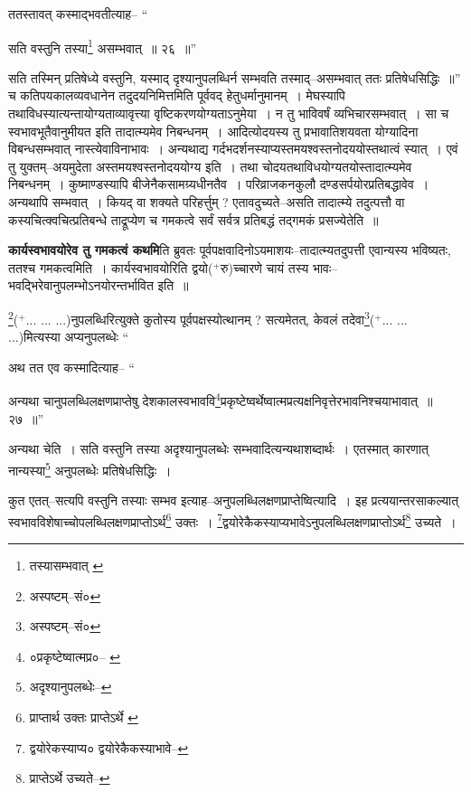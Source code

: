 \documentclass[article,12pt,a4paper]{memoir}
\newcommand{\add}[1]{($^{+}$#1)}
\begin{document}
	ततस्तावत् कस्माद्भवतीत्याह-- “
	  
	सति वस्तुनि तस्या\footnote{तस्यासम्भवात् \cite{dp-msC}} असम्भवात् ॥ २६ ॥” 
	  
	सति तस्मिन् प्रतिषेध्ये वस्तुनि, यस्माद् दृश्यानुपलब्धिर्न सम्भवति तस्माद्--असम्भवात् ततः प्रतिषेधसिद्धिः ॥” च कतिपयकालव्यवधानेन तदुदयनिमित्तमिति पूर्ववद् हेतुधर्मानुमानम् । मेघस्यापि तथाविधस्यात्यन्तायोग्यताव्यावृत्त्या वृष्टिकरणयोग्यताऽनुमेया । न तु भाविवर्षं व्यभिचारसम्भवात् । सा च स्वभावभूतैवानुमीयत इति तादात्म्यमेव निबन्धनम् । आदित्योदयस्य तु प्रभावातिशयवता योग्यादिना विबन्धसम्भवात् नास्त्येवाविनाभावः । अन्यथाद्य गर्दभदर्शनस्याप्यस्तमयश्वस्तनोदययोस्तथात्वं स्यात् । एवं तु युक्तम्--अयमुदेता अस्तमयश्वस्तनोदययोग्य इति । तथा चोदयतथाविधयोग्यतयोस्तादात्म्यमेव निबन्धनम् । कुष्माण्डस्यापि बीजेनैकसामग्र्यधीनतैव । परिव्राजकनकुलौ दण्डसर्पयोरप्रतिबद्धावेव । अन्यथापि सम्भवात् । कियद् वा शक्यते परिहर्त्तुम् ? एतावदुच्यते--असति तादात्म्ये तदुत्पत्तौ वा कस्यचित्क्वचित्प्रतिबन्धे ताद्रूप्येण च गमकत्वे सर्वं सर्वत्र प्रतिबद्धं तद्गमकं प्रसज्येतेति ॥
	\pend
      

	  \pstart \textbf{कार्यस्वभावयोरेव तु गमकत्वं कथमि}ति ब्रुवतः पूर्वपक्षवादिनोऽयमाशयः--तादात्म्यतदुपत्ती एवान्यस्य भविष्यतः, ततश्च गमकत्वमिति । कार्यस्वभावयोरिति द्वयो\add{रु}च्चारणे चायं तस्य भावः--भवद्भिरेवानुपलम्भोऽनयोरन्तर्भावित इति ॥
	\pend
      

	  \pstart \footnote{अस्पष्टम्--सं०}\add{... ... ...}नुपलब्धिरित्युक्ते कुतोस्य पूर्वपक्षस्योत्थानम् ? सत्यमेतत्, केवलं तदेवा\footnote{अस्पष्टम्--सं०}\add{... ... ...}मित्यस्या अप्यनुपल\leavevmode{}ब्धेः  \leavevmode{} “
	  
	अथ तत एव कस्मादित्याह-- “
	  
	अन्यथा चानुपलब्धिलक्षणप्राप्तेषु देशकालस्वभाववि\footnote{०प्रकृष्टेष्वात्मप्र०--\cite{dp-msB} \cite{dp-edP} \cite{dp-edH} \cite{dp-edE} \cite{dp-edN}}प्रकृष्टेष्वर्थेष्वात्मप्रत्यक्षनिवृत्तेरभावनिश्चयाभावात् ॥ २७ ॥” 
	  
	अन्यथा चेति । सति वस्तुनि तस्या अदृश्यानुपलब्धेः सम्भवादित्यन्यथाशब्दार्थः । एतस्मात् कारणात् नान्यस्या\footnote{अदृश्यानुपलब्धेः--\cite{dp-msD-n}} अनुपलब्धेः प्रतिषेधसिद्धिः । 
	  
	कुत एतत्--सत्यपि वस्तुनि तस्याः सम्भव इत्याह--अनुपलब्धिलक्षणप्राप्तेष्वित्यादि । इह प्रत्ययान्तरसाकल्यात् स्वभावविशेषाच्चोपलब्धिलक्षणप्राप्तोऽर्थ\footnote{प्राप्तार्थ उक्तः \cite{dp-msA} \cite{dp-msB} \cite{dp-edP} \cite{dp-edH} प्राप्तेऽर्थे \cite{dp-msC}} उक्तः । \footnote{द्वयोरेकस्याप्य० \cite{dp-msB} द्वयोरेकैकस्याभावे--\cite{dp-msC}}द्वयोरेकैकस्याप्यभावेऽनुपलब्धिलक्षणप्राप्तोऽर्थ\footnote{प्राप्तेऽर्थे उच्यते--\cite{dp-msC}} उच्यते । 
	  
\end{document}
